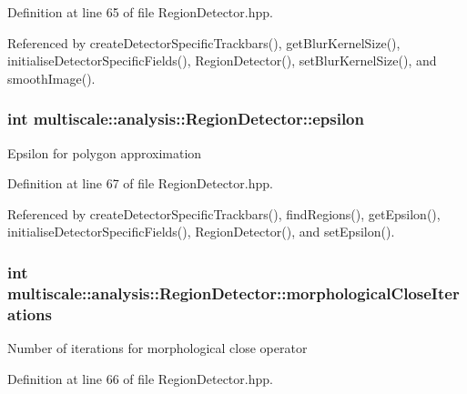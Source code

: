 Definition at line 65 of file Region\-Detector.\-hpp.



Referenced by create\-Detector\-Specific\-Trackbars(), get\-Blur\-Kernel\-Size(), initialise\-Detector\-Specific\-Fields(), Region\-Detector(), set\-Blur\-Kernel\-Size(), and smooth\-Image().

\hypertarget{classmultiscale_1_1analysis_1_1RegionDetector_acf21910fadd7c6ef2810743a78a0aeb9}{
\subsubsection[{epsilon}]{\setlength{\rightskip}{0pt plus 5cm}int multiscale\-::analysis\-::\-Region\-Detector\-::epsilon\hspace{0.3cm}{\ttfamily [private]}}}\label{classmultiscale_1_1analysis_1_1RegionDetector_acf21910fadd7c6ef2810743a78a0aeb9}
Epsilon for polygon approximation 

Definition at line 67 of file Region\-Detector.\-hpp.



Referenced by create\-Detector\-Specific\-Trackbars(), find\-Regions(), get\-Epsilon(), initialise\-Detector\-Specific\-Fields(), Region\-Detector(), and set\-Epsilon().

\hypertarget{classmultiscale_1_1analysis_1_1RegionDetector_a700a2f299d7c56fbd1fdbec68092f23a}{
\subsubsection[{morphological\-Close\-Iterations}]{\setlength{\rightskip}{0pt plus 5cm}int multiscale\-::analysis\-::\-Region\-Detector\-::morphological\-Close\-Iterations\hspace{0.3cm}{\ttfamily [private]}}}\label{classmultiscale_1_1analysis_1_1RegionDetector_a700a2f299d7c56fbd1fdbec68092f23a}
Number of iterations for morphological close operator 

Definition at line 66 of file Region\-Detector.\-hpp.



